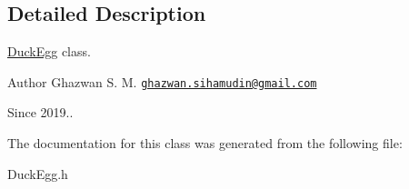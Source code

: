 \subsection{Detailed Description}
\hyperlink{classDuckEgg}{Duck\+Egg} class.

\begin{DoxyAuthor}{Author}
Ghazwan S. M. \href{mailto:ghazwan.sihamudin@gmail.com}{\tt ghazwan.\+sihamudin@gmail.\+com} 
\end{DoxyAuthor}
\begin{DoxySince}{Since}
2019.. 
\end{DoxySince}


The documentation for this class was generated from the following file\+:\begin{DoxyCompactItemize}
\item 
Duck\+Egg.\+h\end{DoxyCompactItemize}

